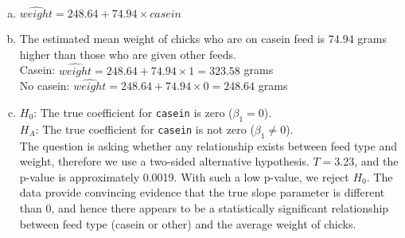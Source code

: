 {
\begin{enumerate}[(a)]
\setlength{\itemsep}{0mm}
\item $\widehat{weight} = 248.64 + 74.94 \times casein$
\item The estimated mean weight of chicks who are on casein feed is 74.94 grams higher than those who are given other feeds. \\
Casein: $\widehat{weight} = 248.64 + 74.94 \times 1 = 323.58$ grams \\
No casein: $\widehat{weight} = 248.64 + 74.94 \times 0 = 248.64$ grams
\item $H_0$: The true coefficient for \texttt{casein} is zero ($\beta_1 = 0$). \\
$H_A$: The true coefficient for \texttt{casein} is not zero ($\beta_1 \ne 0$). \\
The question is asking whether any relationship exists
 between feed type and weight, therefore we use a two-sided alternative hypothesis. $T = 3.23$, and the p-value is approximately 0.0019. With such a low p-value, we reject $H_0$. The data provide convincing evidence that the true slope parameter is different than 0, and hence there appears to be a statistically significant relationship between feed type (casein or other) and the average weight of chicks. 
\end{enumerate}
}\label{chickwtsCasein}



